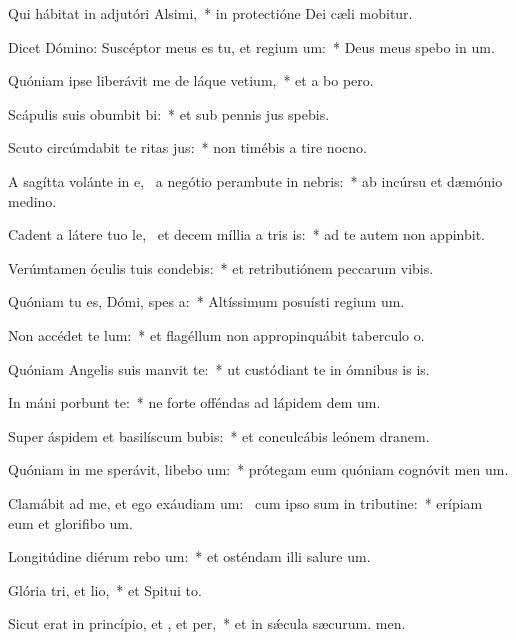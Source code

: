 \item Qui hábitat in adjutóri Alsimi,~* in protectióne Dei cæli mobitur.
\item Dicet Dómino: Suscéptor meus es tu, et regium um:~* Deus meus spebo in um.
\item Quóniam ipse liberávit me de láque vetium,~* et a bo pero.
\item Scápulis suis obumbit bi:~* et sub pennis jus spebis.
\item Scuto circúmdabit te ritas jus:~* non timébis a tire nocno.
\item A sagítta volánte in e,~\pscross{} a negótio perambute in nebris:~* ab incúrsu et dæmónio medino.
\item Cadent a látere tuo le,~\pscross{} et decem míllia a tris is:~* ad te autem non appinbit.
\item Verúmtamen óculis tuis condebis:~* et retributiónem peccarum vibis.
\item Quóniam tu es, Dómi, spes a:~* Altíssimum posuísti regium um.
\item Non accédet  te lum:~* et flagéllum non appropinquábit taberculo o.
\item Quóniam Angelis suis manvit  te:~* ut custódiant te in ómnibus is is.
\item In máni porbunt te:~* ne forte offéndas ad lápidem dem um.
\item Super áspidem et basilíscum bubis:~* et conculcábis leónem  dranem.
\item Quóniam in me sperávit, libebo um:~* prótegam eum quóniam cognóvit men um.
\item Clamábit ad me, et ego exáudiam um:~\pscross{} cum ipso sum in tributine:~* erípiam eum et glorifibo um.
\item Longitúdine diérum rebo um:~* et osténdam illi salure um.
\item Glória tri, et lio,~* et Spitui to.
\item Sicut erat in princípio, et , et per,~* et in sǽcula sæcurum. men.
